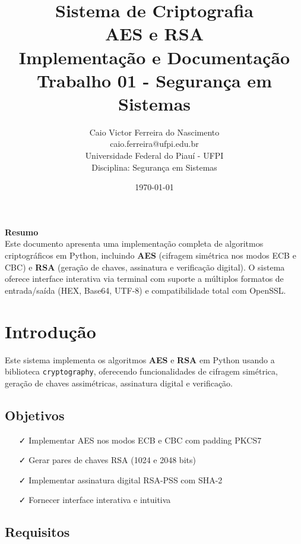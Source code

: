\documentclass[12pt,a4paper]{article}
\title{
    \Huge\textbf{\color{primaryblue}Sistema de Criptografia}\\
    \vspace{5mm}
    \Large\textbf{AES e RSA}\\
    \vspace{3mm}
    \large Implementação e Documentação\\
    \vspace{2mm}
    \normalsize Trabalho 01 - Segurança em Sistemas
}
\author{
    \large Caio Victor Ferreira do Nascimento\\
    \normalsize caio.ferreira@ufpi.edu.br\\
    \normalsize Universidade Federal do Piauí - UFPI\\
    \normalsize Disciplina: Segurança em Sistemas
}
\date{\today}
\begin{document}
\maketitle
\thispagestyle{empty}

\vspace{15mm}
\begin{center}
\begin{tcolorbox}[width=0.85\textwidth,colback=primaryblue!5,colframe=primaryblue,arc=5mm]
\centering
\Large\textbf{Resumo}\\
\vspace{3mm}
\normalsize
Este documento apresenta uma implementação completa de algoritmos criptográficos em Python, incluindo \textbf{AES} (cifragem simétrica nos modos ECB e CBC) e \textbf{RSA} (geração de chaves, assinatura e verificação digital). O sistema oferece interface interativa via terminal com suporte a múltiplos formatos de entrada/saída (HEX, Base64, UTF-8) e compatibilidade total com OpenSSL.
\end{tcolorbox}
\end{center}

\newpage

\section{Introdução}

Este sistema implementa os algoritmos \textbf{AES} e \textbf{RSA} em Python usando a biblioteca \texttt{cryptography}, oferecendo funcionalidades de cifragem simétrica, geração de chaves assimétricas, assinatura digital e verificação.

\subsection{Objetivos}

\begin{itemize}[leftmargin=*]
    \item[\faCheck] Implementar AES nos modos ECB e CBC com padding PKCS7
    \item[\faCheck] Gerar pares de chaves RSA (1024 e 2048 bits)
    \item[\faCheck] Implementar assinatura digital RSA-PSS com SHA-2
    \item[\faCheck] Fornecer interface interativa e intuitiva
\end{itemize}

\subsection{Requisitos}
\end{document}
